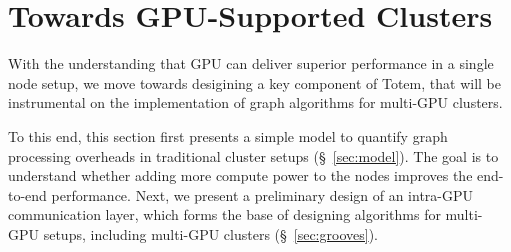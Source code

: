 \documentclass{acm_proc_article-sp}[12pt]
\begin{document}



\section{Towards GPU-Supported Clusters}
\label{sec:cluster}
With the understanding that GPU can deliver superior performance in a single node setup, we move towards desigining a key component of {\sc Totem}, that will be instrumental on the implementation of graph algorithms for multi-GPU clusters. 

To this end, this section first presents a simple model to quantify graph processing overheads in traditional cluster setups (\S~\ref{sec:model}). The goal is to understand whether adding more compute power to the nodes improves the end-to-end performance. Next, we present a preliminary design of an intra-GPU communication layer, which forms the base of designing algorithms for multi-GPU setups, including multi-GPU clusters (\S~\ref{sec:grooves}).








\end{document}
